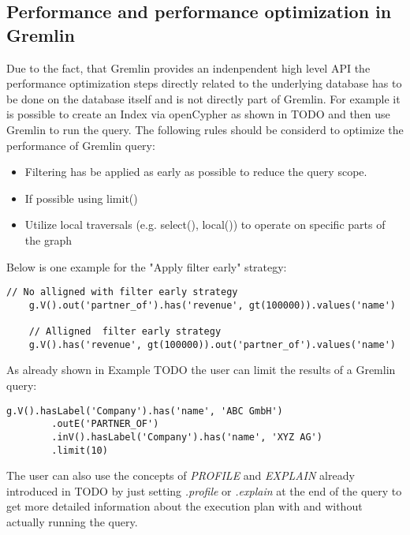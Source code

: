 \subsection{Performance and performance optimization in Gremlin}
\label{subsec:different_query_languages_for_graph_databases:gremlin:performance}
Due to the fact, that Gremlin provides an indenpendent high level API 
the performance optimization steps directly related to the underlying database
has to be done on the database itself and is not directly part of Gremlin.
For example it is possible to create an Index via openCypher as shown in TODO and then use
Gremlin to run the query.
The following rules should be considerd to optimize the performance of Gremlin query:
\begin{itemize}
	\item Filtering has be applied as early as possible to reduce the query scope.
	\item If possible using limit()
	\item Utilize local traversals (e.g. select(), local()) to operate on specific parts of the graph
\end{itemize}
Below is one example for the "Apply filter early" strategy:
\begin{lstlisting}[caption={Apply filter early strategy in Gremlin}, label={lst:filterEarlyGremlin}]
	// No alligned with filter early strategy
	g.V().out('partner_of').has('revenue', gt(100000)).values('name')

	// Alligned  filter early strategy
	g.V().has('revenue', gt(100000)).out('partner_of').values('name')

\end{lstlisting}
As already shown in Example TODO the user can limit the results of a Gremlin query:
\begin{lstlisting}[caption={Set Limits in Gremlin}, label={lst:limitGremlin}]
	g.V().hasLabel('Company').has('name', 'ABC GmbH')
		.outE('PARTNER_OF')
		.inV().hasLabel('Company').has('name', 'XYZ AG')
		.limit(10)
\end{lstlisting}
The user can also use the concepts of \textit{PROFILE} and \textit{EXPLAIN} already introduced in 
TODO by just setting
\textit{.profile} or \textit{.explain} at the end of the query to get more detailed 
information about the execution plan with and without actually running the query.

